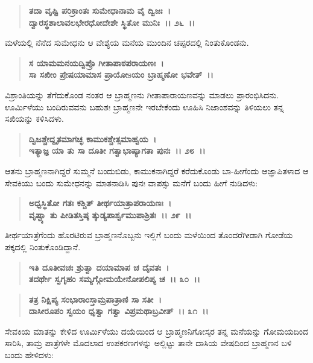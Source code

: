 \begin{verse}
\textbf{ತದಾ ವೃಷ್ಟಿ ಪರಿಕ್ರಾಂತಃ ಸುಮೇಧಾನಾಮ ವೈ ದ್ವಿಜಃ~।}\\\textbf{ದ್ವಾರಸ್ಥಶಾಲಾವಲಭೇರಧೋದೇಶೇ ಸ್ಥಿತೋ ಮುನಿಃ~।। ೨೬~।।}
\end{verse}

ಮಳೆಯಲ್ಲಿ ನೆನೆದ ಸುಮೇಧನು ಆ ವೇಶ್ಯೆಯ ಮನೆಯ ಮುಂದಿನ ಚಪ್ಪರದಲ್ಲಿ ನಿಂತುಕೊಂಡನು.

\begin{verse}
\textbf{ಸ ಯಾಮಮನಯದ್ವಿಪ್ರೊ ಗೀತಾಪಾಠಪರಾಯಣಃ~।}\\\textbf{ಸಾ ಸಖೀಂ ಪ್ರೇಷಯಾಮಾಸ ಪ್ರಾಯೋsಯಂ ಬ್ರಾಹ್ಮಣೋ ಭವೇತ್~।।}
\end{verse}

ವಿಶ್ರಾಂತಿಯನ್ನು ತೆಗೆದುಕೊಂಡ ನಂತರ ಆ ಬ್ರಾಹ್ಮಣನು ಗೀತಾಪಾರಾಯಣವನ್ನು ಮಾಡಲು ಪ್ರಾರಂಭಿಸಿದನು. ಊರ್ಮಿಳೆಯು ಬಂದಿರುವವನು ಬಹುಶಃ ಬ್ರಾಹ್ಮಣನೇ ಇರಬೇಕೆಂದು ಊಹಿಸಿ ನಿಜಾಂಶವನ್ನು ತಿಳಿಯಲು ತನ್ನ ಸಖಿಯನ್ನು ಕಳಿಸಿದಳು.

\begin{verse}
\textbf{ದ್ವಿಜಶ್ಚೇದ್ದೃತಮಾಗಚ್ಛ ಕಾಮುಕಶ್ಚೇತ್ಸಮಾಹ್ವಯ~।}\\\textbf{ಇತ್ಯಾಜ್ಞ ಯಾ ತು ಸಾ ದೂತೀ ಗತ್ವಾಭಾಷ್ಯಾಗತಾ ಪುನಃ~।। ೨೮~।।}
\end{verse}

ಆತನು ಬ್ರಾಹ್ಮಣನಾಗಿದ್ದರೆ ಸುಮ್ಮನೆ ಬಂದುಬಿಡು, ಕಾಮುಕನಾಗಿದ್ದರೆ ಕರೆದುಕೊಂಡು ಬಾ-ಹೀಗೆಂದು ಆಜ್ಞಾಪಿತಳಾದ ಆ ಸೇವಕಿಯು ಬಂದು ಸುಮೇಧನನ್ನು ಮಾತನಾಡಿಸಿ ಪುನಃ ವಾಪಸ್ಸು ಮನೆಗೆ ಬಂದು ಹೀಗೆ ನುಡಿದಳು:

\begin{verse}
\textbf{ಅಧ್ವಸ್ಥಿತೋ ಗತಃ ಕಶ್ಚಿತ್ ತೀರ್ಥಯಾತ್ರಾಪರಾಯಣಃ~।}\\\textbf{ವೃಷ್ಟ್ಯಾ ತು ಪೀಡಿತಸ್ತಿಷ್ಠ ತ್ಕುಡ್ಯಪಾರ್ಶ್ವಮುಪಾಶ್ರಿತಃ~।। ೨೯~।।}
\end{verse}

ತೀರ್ಥಯಾತ್ರೆಗೆಂದು ಹೊರಟಿರುವ ಬ್ರಾಹ್ಮಣನೊಬ್ಬನು ಇಲ್ಲಿಗೆ ಬಂದು ಮಳೆಯಿಂದ ತೊಂದರೆಗೀಡಾಗಿ ಗೋಡೆಯ ಪಕ್ಕದಲ್ಲಿ ನಿಂತುಕೊಂಡಿದ್ದಾನೆ.

\begin{verse}
\textbf{ಇತಿ ದೂತೀವಚಃ ಶ್ರುತ್ವಾ ದಯಾಮಾಪ ಚ ದೈವತಃ~।}\\\textbf{ತದರ್ಥೇ ಸ್ವಗೃಹಂ ಸಮ್ಯಗ್ಗೋಮಯೇನೋಪಲಿಪ್ಯ ಚ~।। ೩೦~।। }
\end{verse}

\begin{verse}
\textbf{ತತ್ರ ನಿಕ್ಷಿಪ್ಯ ಸಂಭಾರಾಂಸ್ತಾಮ್ರಪಾತ್ರಾಣಿ ಸಾ ಸತೀ~।}\\\textbf{ದಾಸೀರೂಪಂ ಸ್ವಯಂ ಧೃತ್ವಾ ಗತ್ವಾ ವಿಪ್ರಮಥಾಬ್ರವೀತ್~।। ೩೧~।।}
\end{verse}

ಸೇವಕಿಯ ಮಾತನ್ನು ಕೇಳಿದ ಊರ್ಮಿಳೆಯು ದಯೆಯಿಂದ ಆ ಬ್ರಾಹ್ಮಣನಿಗೋಸ್ಕರ ತನ್ನ ಮನೆಯನ್ನು ಗೋಮಯದಿಂದ ಸಾರಿಸಿ, ತಾಮ್ರ ಪಾತ್ರೆಗಳೇ ಮೊದಲಾದ ಉಪಕರಣಗಳನ್ನು ಅಲ್ಲಿಟ್ಟು ತಾನೇ ದಾಸಿಯ ವೇಷದಿಂದ ಬ್ರಾಹ್ಮಣನ ಬಳಿ ಬಂದು ಹೇಳಿದಳು:

